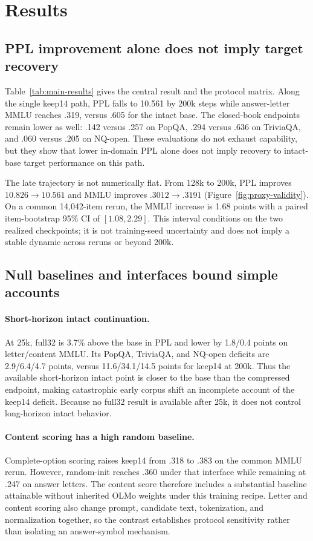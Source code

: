 \section{Results}
\label{sec:experiments}

\subsection{PPL improvement alone does not imply target recovery}


Table~\ref{tab:main-results} gives the central result and the protocol matrix.
Along the single keep14 path, PPL falls to 10.561 by 200k steps while
answer-letter MMLU reaches .319, versus .605 for the intact base. The
closed-book endpoints remain lower as well: .142 versus .257 on PopQA, .294
versus .636 on TriviaQA, and .060 versus .205 on NQ-open. These evaluations do
not exhaust capability, but they show that lower in-domain PPL alone does not
imply recovery to intact-base target performance on this path.

The late trajectory is not numerically flat. From 128k to 200k, PPL improves
$10.826\!\rightarrow\!10.561$ and MMLU improves
$.3012\!\rightarrow\!.3191$ (Figure~\ref{fig:proxy-validity}). On a common
14,042-item rerun, the MMLU increase is 1.68 points with a paired item-bootstrap
95\% CI of $[1.08,2.29]$. This interval conditions on the two realized
checkpoints; it is not training-seed uncertainty and does not imply a stable
dynamic across reruns or beyond 200k.

\subsection{Null baselines and interfaces bound simple accounts}
\paragraph{Short-horizon intact continuation.}
At 25k, full32 is 3.7\% above the base in PPL and lower by 1.8/0.4 points on
letter/content MMLU. Its PopQA, TriviaQA, and NQ-open deficits are
2.9/6.4/4.7 points, versus 11.6/34.1/14.5 points for keep14 at 200k. Thus the
available short-horizon intact point is closer to the base than the compressed
endpoint, making catastrophic early corpus shift an incomplete account of the
keep14 deficit. Because no full32 result is available after 25k, it does not
control long-horizon intact behavior.

\paragraph{Content scoring has a high random baseline.}
Complete-option scoring raises keep14 from .318 to .383 on the common MMLU
rerun. However, random-init reaches .360 under that interface while remaining
at .247 on answer letters. The content score therefore includes a substantial
baseline attainable without inherited OLMo weights under this training recipe.
Letter and content scoring also change prompt, candidate text, tokenization,
and normalization together, so the contrast establishes protocol sensitivity
rather than isolating an answer-symbol mechanism.

